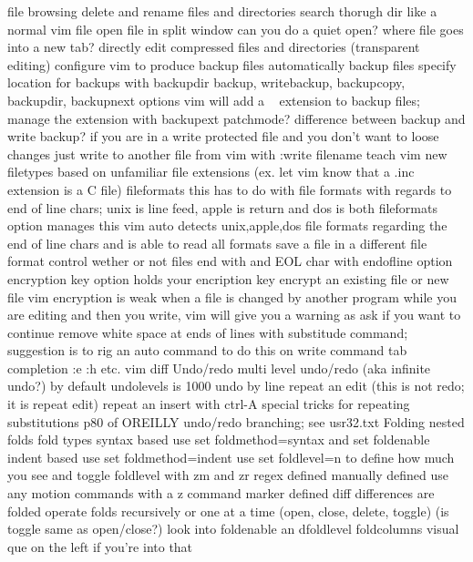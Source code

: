\documentclass[12pt]{book}
\begin{document}
{    file browsing
      delete and rename files and directories
      search thorugh dir like a normal vim file
      open file in split window
      can you do a quiet open? where file goes into a new tab?
    directly edit compressed files and directories (transparent editing)
    configure vim to produce backup files
      automatically backup files
      specify location for backups with backupdir
      backup, writebackup, backupcopy, backupdir, backupnext options
      vim will add a ~ extension to backup files; manage the extension with backupext
      patchmode?
      difference between backup and write backup?
      if you are in a write protected file and you don't want to loose changes just write to another file from vim with :write filename
    teach vim new filetypes based on unfamiliar file extensions (ex. let vim know that a .inc extension is a C file)
    fileformats
      this has to do with file formats with regards to end of line chars; unix is line feed, apple is return and dos is both
      fileformats option manages this
      vim auto detects unix,apple,dos file formats regarding the end of line chars and is able to read all formats
      save a file in a different file format
    control wether or not files end with and EOL char with endofline option
    encryption
      key option holds your encription key
      encrypt an existing file or new file
      vim encryption is weak
    when a file is changed by another program while you are editing and then you write, vim will give you a warning as ask if you want to continue
    remove white space at ends of lines with substitude command; suggestion is to rig an auto command to do this on write
  command tab completion :e :h etc.
  vim diff
  Undo/redo
    multi level undo/redo (aka infinite undo?)
      by default undolevels is 1000
    undo by line
    repeat an edit (this is not redo; it is repeat edit)
    repeat an insert with ctrl-A
    special tricks for repeating substitutions p80 of OREILLY
    undo/redo branching; see usr32.txt
  Folding
    nested folds
    fold types
      syntax based
        use set foldmethod=syntax and set foldenable
      indent based
        use set foldmethod=indent
        use set foldlevel=n to define how much you see and toggle foldlevel with zm and zr
      regex defined
      manually defined
        use any motion commands with a z command
      marker defined
      diff differences are folded
    operate folds recursively or one at a time (open, close, delete, toggle) (is toggle same as open/close?)
    look into foldenable an dfoldlevel
    foldcolumns visual que on the left if you're into that
}
\end{document}
